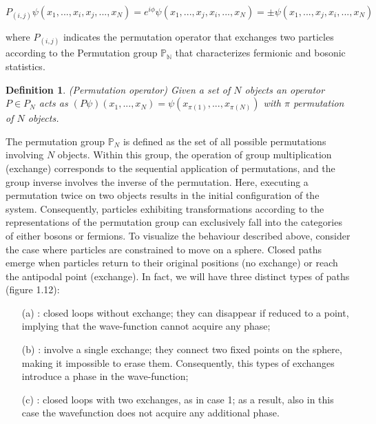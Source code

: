 \documentclass{Configuration_Files/PoliMi3i_thesis}
\newtheorem{definition}{Definition}[chapter]
\begin{document}
\begin{center}	
	$P_{(i,j)}\psi(x_1, ..., x_i,x_j, ..., x_N)=e^{i\phi} \psi(x_1, ..., x_j,x_i, ..., x_N)=\pm \psi(x_1, ..., x_j,x_i, ..., x_N)$
\end{center}

where $P_{(i,j)}$ indicates the permutation operator that exchanges two particles according to the Permutation group $\mathbb{P_N}$ that characterizes fermionic and bosonic statistics. 

\begin{definition}(Permutation operator)
	Given a set of $N$ objects an operator $P \in P_N$ acts as $(P \psi)(x_1,...,x_N)=\psi(x_{\pi(1)}, ..., x_{\pi(N)})$ with $\pi$ permutation of $N$ objects.
\end{definition}

The permutation group $\mathbb{P}_N$ is defined as the set of all possible permutations involving $N$ objects. Within this group, the operation of group multiplication (exchange) corresponds to the sequential application of permutations, and the group inverse involves the inverse of the permutation. Here, executing a permutation twice on two objects results in the initial configuration of the system. Consequently, particles exhibiting transformations according to the representations of the permutation group can exclusively fall into the categories of either bosons or fermions.
To visualize the behaviour described above, consider the case where particles are constrained to move on a sphere. Closed paths emerge when particles return to their original positions (no exchange) or reach the antipodal point (exchange). In fact, we will have three distinct types of paths (figure 1.12): 

\begin{enumerate}
	\item[(a)]: closed loops without exchange; they can disappear if reduced to a point, implying that the wave-function cannot acquire any phase; 
	
	\item[(b)] : involve a single exchange; they connect two fixed points on the sphere, making it impossible to erase them. Consequently, this types of exchanges introduce a phase in the wave-function;
	
	\item[(c)] : closed loops with two exchanges, as in case 1; as a result, also in this case the wavefunction does not acquire any additional phase.
\end{enumerate}
\end{document}
